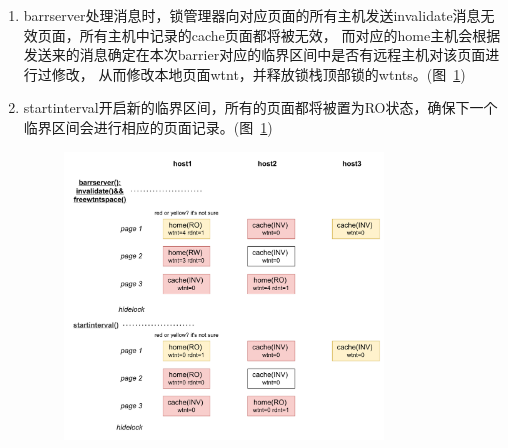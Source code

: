 {\begin{enumerate}[label=\arabic*.]
        \item barrserver处理消息时，锁管理器向对应页面的所有主机发送invalidate消息无效页面，所有主机中记录的cache页面都将被无效，
              而对应的home主机会根据发送来的消息确定在本次barrier对应的临界区间中是否有远程主机对该页面进行过修改，
              从而修改本地页面wtnt，并释放锁栈顶部锁的wtnts。(图~\ref{fig:JIAJIA-barrier2})
        \item startinterval开启新的临界区间，所有的页面都将被置为RO状态，确保下一个临界区间会进行相应的页面记录。(图~\ref{fig:JIAJIA-barrier2})

              \begin{figure}[!htbp]
                  \centering
                  \includegraphics[width=0.8\textwidth]{Img/jiajia_barrier_sync2.drawio.pdf}
                  \label{fig:JIAJIA-barrier2}
              \end{figure}
    \end{enumerate}


}
